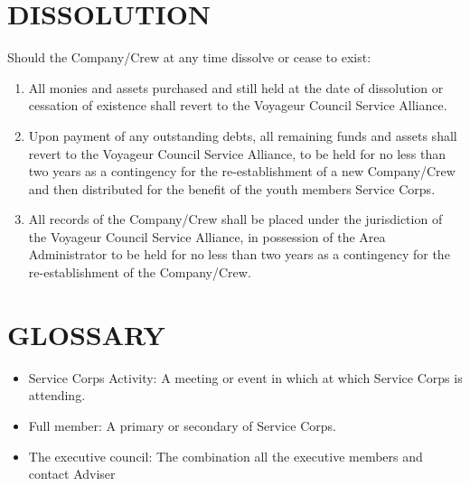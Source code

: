 \documentclass{Service_Corps_Document}
\begin{document}
    \section{DISSOLUTION}
    Should the Company/Crew at any time dissolve or cease to exist:
    \begin{enumerate}
        \item All monies and assets purchased and still held at the date of dissolution or cessation of existence shall revert to the Voyageur Council Service Alliance.
        \item Upon payment of any outstanding debts, all remaining funds and assets shall revert to the Voyageur Council Service Alliance, to be held for no less than two years as a contingency for the re-establishment of a new Company/Crew and then distributed for the benefit of the youth members Service Corps.
        \item All records of the Company/Crew shall be placed under the jurisdiction of the Voyageur Council Service Alliance, in possession of the Area Administrator to be held for no less than two years as a contingency for the re-establishment of the Company/Crew.
    \end{enumerate}


    \section{GLOSSARY}
    \begin{itemize}
        \item Service Corps Activity: A meeting or event in which at which Service Corps is attending.
        \item Full member: A primary or secondary of Service Corps.
        \item The executive council: The combination all the executive members and contact Adviser
    \end{itemize}
\end{document}
